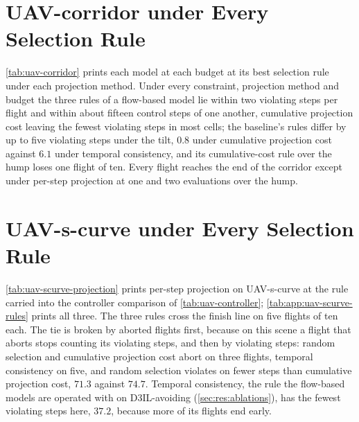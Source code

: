 \FloatBarrier

\section{UAV-corridor under Every Selection Rule}\label{app:uav-corridor-rules}

\autoref{tab:uav-corridor} prints each model at each budget at its best selection rule under each
projection method. Under every constraint, projection method and budget the three rules of a
flow-based model lie within two violating steps per flight and within about fifteen control steps of
one another, cumulative projection cost leaving the fewest violating steps in most cells; the
baseline's rules differ by up to five violating steps under the tilt, $0.8$ under cumulative projection
cost against $6.1$ under temporal consistency, and its cumulative-cost rule over the hump loses one
flight of ten. Every flight reaches the end of the corridor except under per-step projection at one and
two evaluations over the hump.
\ifappendixfull

\else
\label{tab:app:uav-corridor-tilt-ps}\label{tab:app:uav-corridor-tilt-ep}\label{tab:app:uav-corridor-hump-ps}\label{tab:app:uav-corridor-hump-ep}
\fi

\FloatBarrier
\section{UAV-s-curve under Every Selection Rule}\label{app:uav-scurve-rules}

\autoref{tab:uav-scurve-projection} prints per-step projection on UAV-s-curve at the rule carried into the
controller comparison of \autoref{tab:uav-controller}; \autoref{tab:app:uav-scurve-rules} prints all three. The
three rules cross the finish line on five flights of ten each. The tie is broken by aborted flights first,
because on this scene a flight that aborts stops counting its violating steps, and then by violating steps:
random selection and cumulative projection cost abort on three flights, temporal consistency on five, and
random selection violates on fewer steps than cumulative projection cost, $71.3$ against $74.7$. Temporal
consistency, the rule the flow-based models are operated with on D3IL-avoiding (\autoref{sec:res:ablations}),
has the fewest violating steps here, $37.2$, because more of its flights end early.

